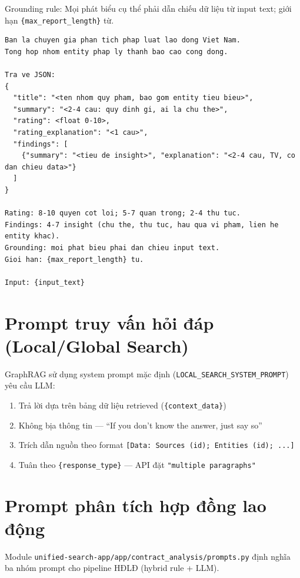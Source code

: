 \documentclass[../DoAn.tex]{subfiles}
\begin{document}
Grounding rule: Mọi phát biểu cụ thể phải dẫn chiếu dữ liệu từ input text; giới hạn \texttt{\{max\_report\_length\}} từ.

\begin{lstlisting}[caption={Prompt \texttt{community\_report\_labor.txt} (rút gọn)},label={lst:community-prompt},basicstyle=\ttfamily\small,breaklines=true,frame=single]
Ban la chuyen gia phan tich phap luat lao dong Viet Nam.
Tong hop nhom entity phap ly thanh bao cao cong dong.

Tra ve JSON:
{
  "title": "<ten nhom quy pham, bao gom entity tieu bieu>",
  "summary": "<2-4 cau: quy dinh gi, ai la chu the>",
  "rating": <float 0-10>,
  "rating_explanation": "<1 cau>",
  "findings": [
    {"summary": "<tieu de insight>", "explanation": "<2-4 cau, TV, co dan chieu data>"}
  ]
}

Rating: 8-10 quyen cot loi; 5-7 quan trong; 2-4 thu tuc.
Findings: 4-7 insight (chu the, thu tuc, hau qua vi pham, lien he entity khac).
Grounding: moi phat bieu phai dan chieu input text.
Gioi han: {max_report_length} tu.

Input: {input_text}
\end{lstlisting}

\section{Prompt truy vấn hỏi đáp (Local/Global Search)}
\label{appendix:b-query}

GraphRAG sử dụng system prompt mặc định (\texttt{LOCAL\_SEARCH\_SYSTEM\_PROMPT}) yêu cầu LLM:
\begin{enumerate}[nosep, leftmargin=*]
    \item Trả lời dựa trên bảng dữ liệu retrieved (\texttt{\{context\_data\}})
    \item Không bịa thông tin --- ``If you don't know the answer, just say so''
    \item Trích dẫn nguồn theo format \texttt{[Data: Sources (id); Entities (id); ...]}
    \item Tuân theo \texttt{\{response\_type\}} --- API đặt \texttt{"multiple paragraphs"}
\end{enumerate}

\section{Prompt phân tích hợp đồng lao động}
\label{appendix:b-contract}

Module \texttt{unified-search-app/app/contract\_analysis/prompts.py} định nghĩa ba nhóm prompt cho pipeline HĐLĐ (hybrid rule + LLM).
\end{document}
